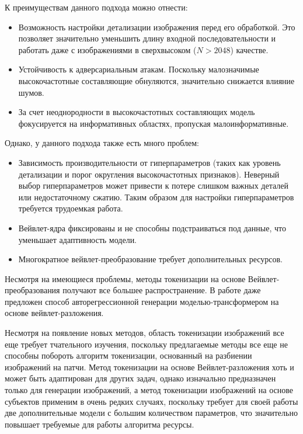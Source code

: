 \documentclass[times,specification,annotation]{itmo-student-thesis}
\begin{document}
К преимуществам данного подхода можно отнести:

\begin{itemize}
    \item Возможность настройки детализации изображения перед его обработкой. Это позволяет значительно уменьшить длину входной последовательности и работать даже с изображениями в сверхвысоком ($N > 2048$) качестве.
    \item Устойчивость к адверсариальным атакам. Поскольку малозначимые высокочастотные составляющие обнуляются, значительно снижается влияние шумов.
    \item За счет неоднородности в высокочастотных составляющих модель фокусируется на информативных областях, пропуская малоинформативные.
\end{itemize}

Однако, у данного подхода также есть много проблем:

\begin{itemize}
    \item Зависимость производительности от гиперпараметров (таких как уровень детализации и порог округления высокочастотных признаков). Неверный выбор гиперпараметров может привести к потере слишком важных деталей или недостаточному сжатию. Таким образом для настройки гиперпараметров требуется трудоемкая работа.
    \item Вейвлет-ядра фиксированы и не способны подстраиваться под данные, что уменьшает адаптивность модели.
    \item Многократное вейвлет-преобразование требует дополнительных ресурсов.
\end{itemize}

Несмотря на имеющиеся проблемы, методы токенизации на основе Вейвлет-преобразования получают все большее распространение. В работе \cite{wavelet_autoregression} даже предложен способ авторегрессионной генерации моделью-трансформером на основе вейвлет-разложения. 

\s\chapterconclusion
Несмотря на появление новых методов, область токенизации изображений все еще требует тчательного изучения, поскольку предлагаемые методы все еще не способны побороть алгоритм токенизации, основанный на разбиении изображений на патчи. Метод токенизации на основе Вейвлет-разложения хоть и может быть адаптирован для других задач, однако изначально предназначен только для генерации изображений, а метод токенизации изображений на основе субъектов применим в очень редких случаях, поскольку требует для своей работы две дополнительные модели с большим количеством параметров, что значительно повышает требуемые для работы алгоритма ресурсы. 
\end{document}
